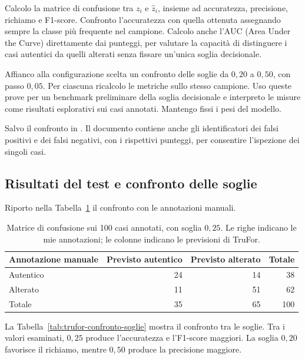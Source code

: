 Calcolo la matrice di confusione tra $z_i$ e $\widehat{z}_i$, insieme ad accuratezza, precisione, richiamo e F1-score. Confronto l'accuratezza con quella ottenuta assegnando sempre la classe più frequente nel campione. Calcolo anche l’AUC (Area Under the Curve) direttamente dai punteggi, per valutare la capacità di distinguere i casi autentici da quelli alterati senza fissare un’unica soglia decisionale.

Affianco alla configurazione scelta un confronto delle soglie da $0{,}20$ a $0{,}50$, con passo $0{,}05$. Per ciascuna ricalcolo le metriche sullo stesso campione. Uso queste prove per un benchmark preliminare della soglia decisionale e interpreto le misure come risultati esplorativi sui casi annotati. Mantengo fissi i pesi del modello.

Salvo il confronto in . Il documento contiene anche gli identificatori dei falsi positivi e dei falsi negativi, con i rispettivi punteggi, per consentire l'ispezione dei singoli casi.

\subsection{Risultati del test e confronto delle soglie}
\label{subsec:trufor-test-risultati}

Riporto nella Tabella~\ref{tab:trufor-confusione} il confronto con le annotazioni manuali.

\begin{table}[htbp]
    \centering
    \small
    \caption{Matrice di confusione sui 100 casi annotati, con soglia $0{,}25$. Le righe indicano le mie annotazioni; le colonne indicano le previsioni di TruFor.}
    \label{tab:trufor-confusione}
    \begin{tabular}{@{}lrrr@{}}
        \toprule
        Annotazione manuale & Previsto autentico & Previsto alterato & Totale \\
        \midrule
        Autentico & 24 & 14 & 38 \\
        Alterato & 11 & 51 & 62 \\
        \midrule
        Totale & 35 & 65 & 100 \\
        \bottomrule
    \end{tabular}
\end{table}

La Tabella~\ref{tab:trufor-confronto-soglie} mostra il confronto tra le soglie. Tra i valori esaminati, $0{,}25$ produce l'accuratezza e l'F1-score maggiori. La soglia $0{,}20$ favorisce il richiamo, mentre $0{,}50$ produce la precisione maggiore.

